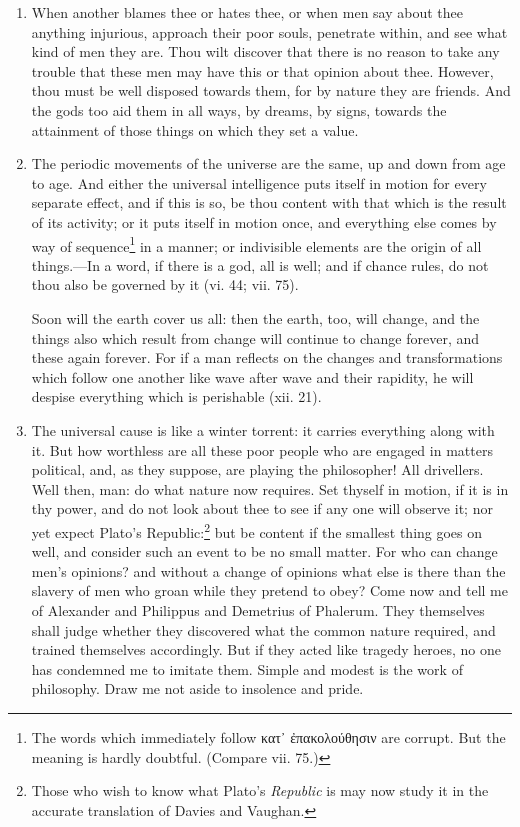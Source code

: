 \begin{enumerate}
\item When another blames thee or hates thee, or when men say about thee anything injurious, approach their poor souls, penetrate within, and see what kind of men they are. Thou wilt discover that there is no reason to take any trouble that these men may have this or that opinion about thee. However, thou must be well disposed towards them, for by nature they are friends. And the gods too aid them in all ways, by dreams, by signs, towards the attainment of those things on which they set a value.

\item The periodic movements of the universe are the same, up and down from age to age. And either the universal intelligence puts itself in motion for every separate effect, and if this is so, be thou content with that which is the result of its activity; or it puts itself in motion once, and everything else comes by way of sequence\footnote{The words which immediately follow \textgreek{κατ᾽ ἐπακολούθησιν} are corrupt. But the meaning is hardly doubtful. (Compare vii. 75.)} in a manner; or indivisible elements are the origin of all things.—In a word, if there is a god, all is well; and if chance rules, do not thou also be governed by it (vi. 44; vii. 75).

Soon will the earth cover us all: then the earth, too, will change, and the things also which result from change will continue to change forever, and these again forever. For if a man reflects on the changes and transformations which follow one another like wave after wave and their rapidity, he will despise everything which is perishable (xii. 21).

\item The universal cause is like a winter torrent: it carries everything along with it. But how worthless are all these poor people who are engaged in matters political, and, as they suppose, are playing the philosopher! All drivellers. Well then, man: do what nature now requires. Set thyself in motion, if it is in thy power, and do not look about thee to see if any one will observe it; nor yet expect Plato's Republic:\footnote{Those who wish to know what Plato's \textit{Republic} is may now study it in the accurate translation of Davies and Vaughan.} but be content if the smallest thing goes on well, and consider such an event to be no small matter. For who can change men's opinions? and without a change of opinions what else is there than the slavery of men who groan while they pretend to obey? Come now and tell me of Alexander and Philippus and Demetrius of Phalerum. They themselves shall judge whether they discovered what the common nature required, and trained themselves accordingly. But if they acted like tragedy heroes, no one has condemned me to imitate them. Simple and modest is the work of philosophy. Draw me not aside to insolence and pride.


\end{enumerate}
